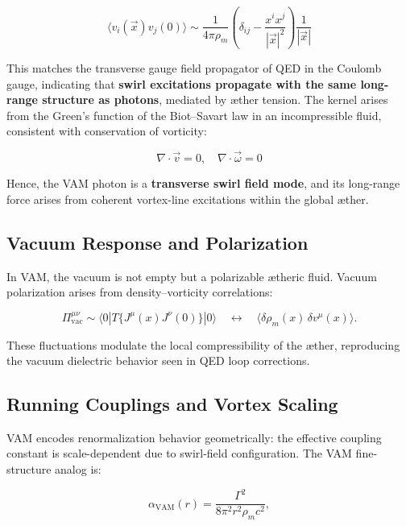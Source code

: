 \documentclass[12pt]{article}
\begin{document}
\begin{equation}
\langle v_i(\vec{x}) v_j(0) \rangle
\sim \frac{1}{4\pi \rho_{\scriptscriptstyle\boldsymbol\!m}} \left( \delta_{ij} - \frac{x^i x^j}{|\vec{x}|^2} \right) \frac{1}{|\vec{x}|}
\end{equation}

This matches the transverse gauge field propagator of QED in the Coulomb gauge, indicating that \textbf{swirl excitations propagate with the same long-range structure as photons}, mediated by æther tension. The kernel arises from the Green’s function of the Biot–Savart law in an incompressible fluid, consistent with conservation of vorticity:

\[
\nabla \cdot \vec{v} = 0, \quad \nabla \cdot \vec{\omega} = 0
\]

Hence, the VAM photon is a \textbf{transverse swirl field mode}, and its long-range force arises from coherent vortex-line excitations within the global æther.

\subsection{Vacuum Response and Polarization}

In VAM, the vacuum is not empty but a polarizable ætheric fluid. Vacuum polarization arises from density–vorticity correlations:

\begin{equation}
\Pi^{\mu\nu}_{\text{vac}} \sim \langle 0 | T\{J^\mu(x) J^\nu(0)\} | 0 \rangle
\quad \leftrightarrow \quad
\langle \delta \rho_{\scriptscriptstyle\boldsymbol\!m}(x) \, \delta v^\mu(x) \rangle.
\end{equation}

These fluctuations modulate the local compressibility of the æther, reproducing the vacuum dielectric behavior seen in QED loop corrections.

\subsection{Running Couplings and Vortex Scaling}

VAM encodes renormalization behavior geometrically: the effective coupling constant is scale-dependent due to swirl-field configuration. The VAM fine-structure analog is:

\begin{equation}
\alpha_{\text{VAM}}(r) = \frac{\Gamma^2}{8\pi^2 r^2 \rho_{\scriptscriptstyle\boldsymbol\!m} c^2},
\end{equation}
\end{document}
